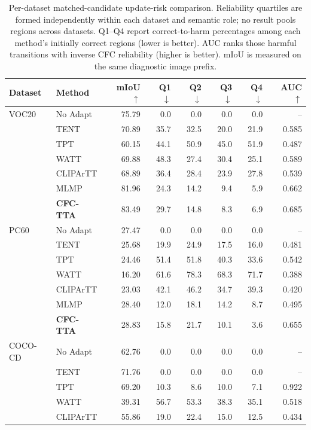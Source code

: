 \begin{table}[t]
\centering
\small
\setlength{\tabcolsep}{4.5pt}
\caption{Per-dataset matched-candidate update-risk comparison. Reliability quartiles are formed independently within each dataset and semantic role; no result pools regions across datasets. Q1--Q4 report correct-to-harm percentages among each method's initially correct regions (lower is better). AUC ranks those harmful transitions with inverse CFC reliability (higher is better). mIoU is measured on the same diagnostic image prefix.}
\label{tab:source-risk-per-dataset}
\begin{tabular}{llrrrrrr}
\toprule
Dataset & Method & mIoU $\uparrow$ & Q1 $\downarrow$ & Q2 $\downarrow$ & Q3 $\downarrow$ & Q4 $\downarrow$ & AUC $\uparrow$ \\
\midrule
VOC20 & No Adapt & 75.79 & 0.0 & 0.0 & 0.0 & 0.0 & -- \\
 & TENT & 70.89 & 35.7 & 32.5 & 20.0 & 21.9 & 0.585 \\
 & TPT & 60.15 & 44.1 & 50.9 & 45.0 & 51.9 & 0.487 \\
 & WATT & 69.88 & 48.3 & 27.4 & 30.4 & 25.1 & 0.589 \\
 & CLIPArTT & 68.89 & 36.4 & 28.4 & 23.9 & 27.8 & 0.539 \\
 & MLMP & 81.96 & 24.3 & 14.2 & 9.4 & 5.9 & 0.662 \\
 & \textbf{CFC-TTA} & 83.49 & 29.7 & 14.8 & 8.3 & 6.9 & 0.685 \\
\midrule
PC60 & No Adapt & 27.47 & 0.0 & 0.0 & 0.0 & 0.0 & -- \\
 & TENT & 25.68 & 19.9 & 24.9 & 17.5 & 16.0 & 0.481 \\
 & TPT & 24.46 & 51.4 & 51.8 & 40.3 & 33.6 & 0.542 \\
 & WATT & 16.20 & 61.6 & 78.3 & 68.3 & 71.7 & 0.388 \\
 & CLIPArTT & 23.03 & 42.1 & 46.2 & 34.7 & 39.3 & 0.420 \\
 & MLMP & 28.40 & 12.0 & 18.1 & 14.2 & 8.7 & 0.495 \\
 & \textbf{CFC-TTA} & 28.83 & 15.8 & 21.7 & 10.1 & 3.6 & 0.655 \\
\midrule
COCO-CD & No Adapt & 62.76 & 0.0 & 0.0 & 0.0 & 0.0 & -- \\
 & TENT & 71.76 & 0.0 & 0.0 & 0.0 & 0.0 & -- \\
 & TPT & 69.20 & 10.3 & 8.6 & 10.0 & 7.1 & 0.922 \\
 & WATT & 39.31 & 56.7 & 53.3 & 38.3 & 35.1 & 0.518 \\
 & CLIPArTT & 55.86 & 19.0 & 22.4 & 15.0 & 12.5 & 0.434 \\

\end{tabular}
\end{table}
